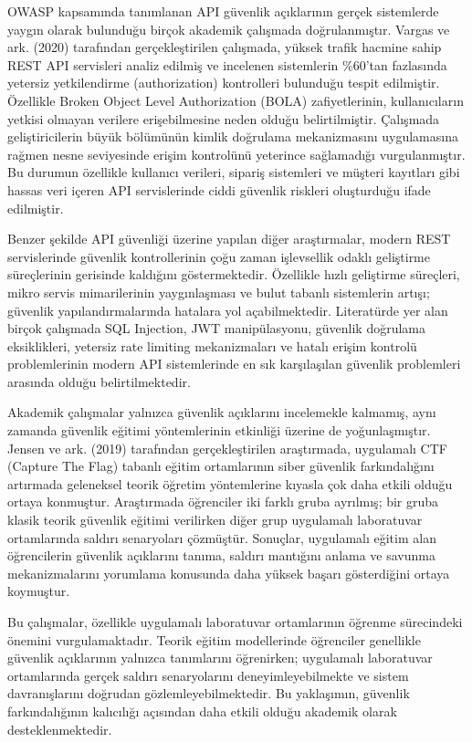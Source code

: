 OWASP kapsamında tanımlanan API güvenlik açıklarının gerçek sistemlerde yaygın olarak bulunduğu birçok akademik çalışmada doğrulanmıştır. Vargas ve ark. (2020) tarafından gerçekleştirilen çalışmada, yüksek trafik hacmine sahip REST API servisleri analiz edilmiş ve incelenen sistemlerin \%60’tan fazlasında yetersiz yetkilendirme (authorization) kontrolleri bulunduğu tespit edilmiştir. Özellikle Broken Object Level Authorization (BOLA) zafiyetlerinin, kullanıcıların yetkisi olmayan verilere erişebilmesine neden olduğu belirtilmiştir. Çalışmada geliştiricilerin büyük bölümünün kimlik doğrulama mekanizmasını uygulamasına rağmen nesne seviyesinde erişim kontrolünü yeterince sağlamadığı vurgulanmıştır. Bu durumun özellikle kullanıcı verileri, sipariş sistemleri ve müşteri kayıtları gibi hassas veri içeren API servislerinde ciddi güvenlik riskleri oluşturduğu ifade edilmiştir.

Benzer şekilde API güvenliği üzerine yapılan diğer araştırmalar, modern REST servislerinde güvenlik kontrollerinin çoğu zaman işlevsellik odaklı geliştirme süreçlerinin gerisinde kaldığını göstermektedir. Özellikle hızlı geliştirme süreçleri, mikro servis mimarilerinin yaygınlaşması ve bulut tabanlı sistemlerin artışı; güvenlik yapılandırmalarında hatalara yol açabilmektedir. Literatürde yer alan birçok çalışmada SQL Injection, JWT manipülasyonu, güvenlik doğrulama eksiklikleri, yetersiz rate limiting mekanizmaları ve hatalı erişim kontrolü problemlerinin modern API sistemlerinde en sık karşılaşılan güvenlik problemleri arasında olduğu belirtilmektedir.

Akademik çalışmalar yalnızca güvenlik açıklarını incelemekle kalmamış, aynı zamanda güvenlik eğitimi yöntemlerinin etkinliği üzerine de yoğunlaşmıştır. Jensen ve ark. (2019) tarafından gerçekleştirilen araştırmada, uygulamalı CTF (Capture The Flag) tabanlı eğitim ortamlarının siber güvenlik farkındalığını artırmada geleneksel teorik öğretim yöntemlerine kıyasla çok daha etkili olduğu ortaya konmuştur. Araştırmada öğrenciler iki farklı gruba ayrılmış; bir gruba klasik teorik güvenlik eğitimi verilirken diğer grup uygulamalı laboratuvar ortamlarında saldırı senaryoları çözmüştür. Sonuçlar, uygulamalı eğitim alan öğrencilerin güvenlik açıklarını tanıma, saldırı mantığını anlama ve savunma mekanizmalarını yorumlama konusunda daha yüksek başarı gösterdiğini ortaya koymuştur.

Bu çalışmalar, özellikle uygulamalı laboratuvar ortamlarının öğrenme sürecindeki önemini vurgulamaktadır. Teorik eğitim modellerinde öğrenciler genellikle güvenlik açıklarının yalnızca tanımlarını öğrenirken; uygulamalı laboratuvar ortamlarında gerçek saldırı senaryolarını deneyimleyebilmekte ve sistem davranışlarını doğrudan gözlemleyebilmektedir. Bu yaklaşımın, güvenlik farkındalığının kalıcılığı açısından daha etkili olduğu akademik olarak desteklenmektedir.

